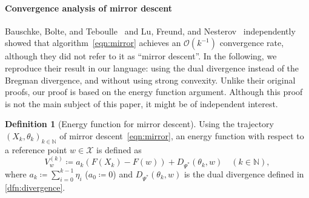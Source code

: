 \documentclass[11pt,a4paper]{article}
\theoremstyle{definition}
\newtheorem{dfn}{Definition}[section]
\theoremstyle{plain}
\newcommand{\NN}{{\mathbb{N}}}
\begin{document}
\paragraph{Convergence analysis of mirror descent}
Bauschke, Bolte, and Teboulle~\cite{BBT2017} and Lu, Freund, and Nesterov~\cite{LFN2018} independently showed that algorithm~\eqref{eqn:mirror} achieves an $\mathcal{O}(k^{-1})$ convergence rate, although they did not refer to it as ``mirror descent''.
In the following, we reproduce their result in our language: using the dual divergence instead of the Bregman divergence, and without using strong convexity.
Unlike their original proofs, our proof is based on the energy function argument.
Although this proof is not the main subject of this paper, it might be of independent interest.

\begin{dfn}[Energy function for mirror descent]
    Using the trajectory $(X_k, \theta_k)_{k \in \NN}$ of mirror descent~\eqref{eqn:mirror}, an energy function with respect to a reference point $w \in \mathcal{X}$ is defined as
    \[
        V_w^{(k)} \coloneqq a_k(F(X_k) - F(w)) + D_{\Psi^\ast}(\theta_k, w) \quad (k \in \NN),
    \]
    where $a_k \coloneqq \sum_{i = 0}^{k - 1}\eta_i$ ($a_0 \coloneqq 0$) and $D_{\Psi^\ast}(\theta_k, w)$ is the dual divergence defined in \cref{dfn:divergence}.
\end{dfn}
\end{document}
